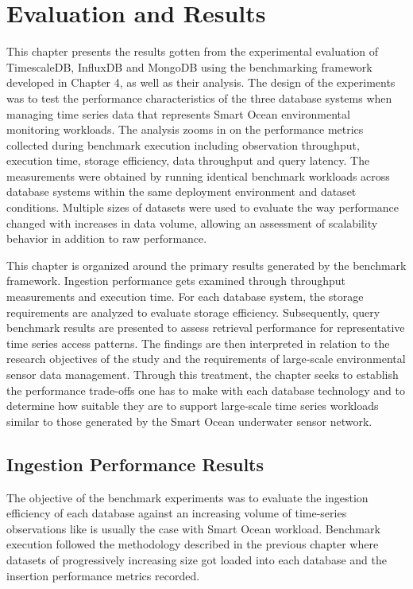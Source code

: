 \chapter{Evaluation and Results}
\label{chap:evaluation}


This chapter presents the results gotten from the experimental evaluation of TimescaleDB, InfluxDB and MongoDB using the benchmarking framework developed in Chapter 4, as well as their analysis. The design of the experiments was to test the performance characteristics of the three database systems when managing time series data that represents Smart Ocean environmental monitoring workloads. The analysis zooms in on the performance metrics collected during benchmark execution including observation throughput, execution time, storage efficiency, data throughput and query latency. The measurements were obtained by running identical benchmark workloads across database systems within the same deployment environment and dataset conditions. Multiple sizes of datasets were used to evaluate the way performance changed with increases in data volume, allowing an assessment of scalability behavior in addition to raw performance. 

This chapter is organized around the primary results generated by the benchmark framework. Ingestion performance gets examined through throughput measurements and execution time. For each database system, the storage requirements are analyzed to evaluate storage efficiency. Subsequently, query benchmark results are presented to assess retrieval performance for representative time series access patterns. The findings are then interpreted in relation to the research objectives of the study and the requirements of large-scale environmental sensor data management. Through this treatment, the chapter seeks to establish the performance trade-offs one has to make with each database technology and to determine how suitable they are to support large-scale time series workloads similar to those generated by the Smart Ocean underwater sensor network. 


\section{Ingestion Performance Results}

The objective of the benchmark experiments was to evaluate the ingestion efficiency of each database against an increasing volume of time-series observations like is usually the case with Smart Ocean workload. Benchmark execution followed the methodology described in the previous chapter where datasets of progressively increasing size got loaded into each database and the insertion performance metrics recorded. 

